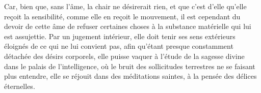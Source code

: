 Car, bien que, sans l’âme, la chair ne désirerait rien, et que c’est d’elle qu’elle reçoit la sensibilité, comme elle en reçoit le mouvement, il est cependant du devoir de cette âme de refuser certaines choses à la substance matérielle qui lui est assujettie. Par un jugement intérieur, elle doit tenir ses sens extérieurs éloignés de ce qui ne lui convient pas, afin qu’étant presque constamment détachée des désirs corporels, elle puisse vaquer à l’étude de la sagesse divine dans le palais de l’intelligence, où le bruit des sollicitudes terrestres ne se faisant plus entendre, elle se réjouit dans des méditations saintes, à la pensée des délices éternelles.